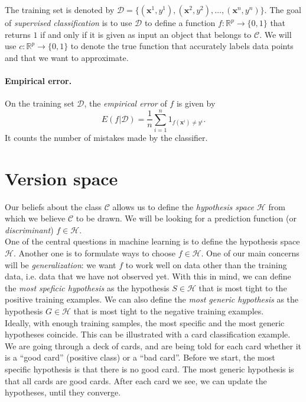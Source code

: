 \documentclass[a4paper,12pt]{article}
\newcommand{\cc}{\mathcal{C}}
\newcommand{\dd}{\mathcal{D}}
\newcommand{\hh}{\mathcal{H}}
\newcommand{\xx}{{\bm x}}
\begin{document}
The training set is denoted by $\dd = \{ (\xx^1, y^1), (\xx^2, y^2), \dots, (\xx^n, y^n) \}$.
The goal of {\em supervised classification} is to use $\dd$ to define a function $f: \mathbb{R}^p \rightarrow \{0, 1\}$ that returns $1$ if and only if it is given as input an object that belongs to $\cc$. 
We will use $c: \mathbb{R}^p \rightarrow \{0, 1\}$ to denote the true function that accurately labels data points and that we want to approximate.

\paragraph{Empirical error.} On the training set $\dd$, the {\em empirical error} of $f$ is given by 
\[
E(f|\dd) = \frac{1}{n}\sum_{i=1}^n 1_{f(\xx^i) \neq y^i}.
\]
It counts the number of mistakes made by the classifier.

\section{Version space} 
Our beliefs about the class $\cc$ allows us to define the {\em hypothesis space $\hh$} from which we believe $\cc$ to be drawn. We will be looking for a prediction function (or {\em discriminant}) $f \in \hh$.\\

One of the central questions in machine learning is to define the hypothesis space $\hh$. Another one is to formulate ways to choose $f \in \hh$. One of our main concerns will be {\em generalization}: we want $f$ to work well on data other than the training data, i.e. data that we have not observed yet. With this in mind, we can define the {\em most speficic hypothesis} as the hypothesis $S \in \hh$ that is most tight to the positive training examples. We can also define the {\em most generic hypothesis} as the hypothesis $G \in \hh$ that is most tight to the negative training examples.\\

Ideally, with enough training samples, the most specific and the most generic hypotheses coincide.
This can be illustrated with a card classification example. We are going through a deck of cards, and are being told for each card whether it is a ``good card'' (positive class) or a ``bad card''. Before we start, the most specific hypothesis is that there is no good card. The most generic hypothesis is that all cards are good cards. After each card we see, we can update the hypotheses, until they converge.\\
\end{document}
